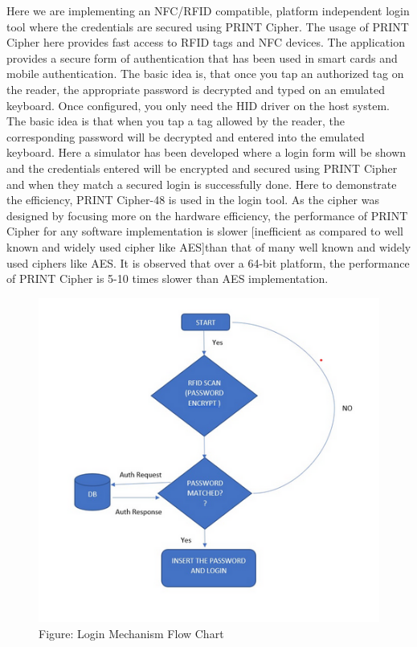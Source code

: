 \documentclass[journal=tosc,preprint]{iacrtrans}
\begin{document}
Here we are implementing an NFC/RFID compatible, platform independent login tool where the credentials are secured using PRINT Cipher. The usage of PRINT Cipher here provides fast access to RFID tags and NFC devices. The application provides a secure form of authentication that has been used in smart cards and mobile authentication. The basic idea is, that once you tap an authorized tag on the reader, the appropriate password is decrypted and typed on an emulated keyboard.
Once configured, you only need the HID driver on the host system. The basic idea is that when you tap a tag allowed by the reader, the corresponding password will be decrypted and entered into the emulated keyboard.
Here a simulator has been developed where a login form will be shown and the credentials entered will be encrypted and secured using PRINT Cipher and when they match a secured login is successfully done. Here to demonstrate the efficiency, PRINT Cipher-48 is used in the login tool.
As the cipher was designed by focusing more on the hardware efficiency, the performance of PRINT Cipher for any software implementation is slower [inefficient as compared to well known and widely used cipher like AES]than that of many well known and widely used ciphers like AES. It is observed that over a 64-bit platform, the performance of PRINT Cipher is 5-10 times slower than AES implementation.
\begin{figure}[ht]
	\centering
	\includegraphics{pics/logintool.png}
	\caption{Figure: Login Mechanism Flow Chart}
\end{figure}

%
%
\end{document}
